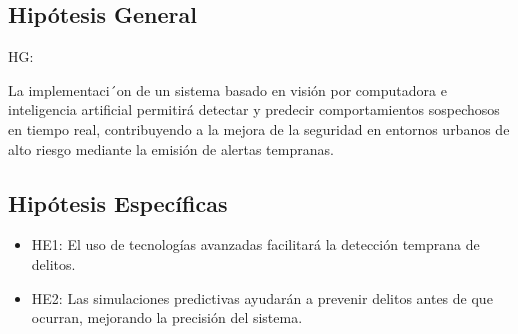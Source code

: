 \subsection{Hipótesis General}
HG: \newcommand{\HipotesisGeneral}{
La implementaci´on de un sistema basado en visión por computadora e inteligencia artificial permitirá detectar y predecir comportamientos sospechosos en tiempo real, contribuyendo a la mejora de la seguridad en entornos urbanos de alto riesgo mediante la emisión de alertas tempranas.
}
\HipotesisGeneral


\subsection{Hipótesis Específicas}
\newcommand{\Hone}{
El uso de tecnologías avanzadas facilitará la detección temprana de delitos.
}
\newcommand{\Htwo}{
Las simulaciones predictivas ayudarán a prevenir delitos antes de que ocurran, mejorando la precisión del sistema.
}


\begin{itemize}
	\item HE1: {\Hone}
	\item HE2: {\Htwo}
\end{itemize}
